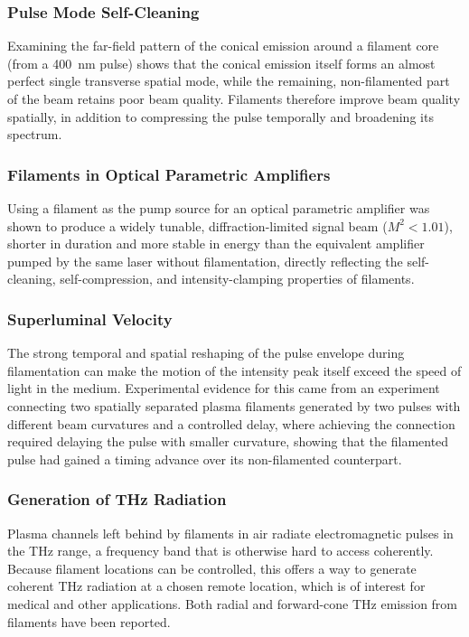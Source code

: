 \documentclass[11pt,a4paper]{article}
\begin{document}
\subsubsection{Pulse Mode Self-Cleaning}
Examining the far-field pattern of the conical emission around a filament core (from a 400~nm pulse) shows that the conical emission itself forms an almost perfect single transverse spatial mode, while the remaining, non-filamented part of the beam retains poor beam quality. Filaments therefore improve beam quality spatially, in addition to compressing the pulse temporally and broadening its spectrum.

\subsubsection{Filaments in Optical Parametric Amplifiers}
Using a filament as the pump source for an optical parametric amplifier was shown to produce a widely tunable, diffraction-limited signal beam ($M^2<1.01$), shorter in duration and more stable in energy than the equivalent amplifier pumped by the same laser without filamentation, directly reflecting the self-cleaning, self-compression, and intensity-clamping properties of filaments.

\subsubsection{Superluminal Velocity}
The strong temporal and spatial reshaping of the pulse envelope during filamentation can make the motion of the intensity peak itself exceed the speed of light in the medium. Experimental evidence for this came from an experiment connecting two spatially separated plasma filaments generated by two pulses with different beam curvatures and a controlled delay, where achieving the connection required delaying the pulse with smaller curvature, showing that the filamented pulse had gained a timing advance over its non-filamented counterpart.

\subsubsection{Generation of THz Radiation}
Plasma channels left behind by filaments in air radiate electromagnetic pulses in the THz range, a frequency band that is otherwise hard to access coherently. Because filament locations can be controlled, this offers a way to generate coherent THz radiation at a chosen remote location, which is of interest for medical and other applications. Both radial and forward-cone THz emission from filaments have been reported.
\end{document}
